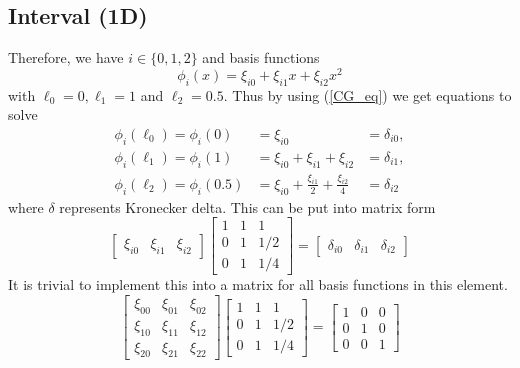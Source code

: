 \documentclass[12pt]{ociamthesis}
\begin{document}
\subsection{Interval (1D)}
Therefore, we have $i \in \{0, 1, 2\}$ and basis functions 
\begin{equation}
\phi_i(x) = \xi_{i0} + \xi_{i1}x + \xi_{i2}x^2
\end{equation}
with $\ell_0 = 0, \ell_1 = 1$ and $\ell_2 = 0.5$. Thus by using (\ref{CG_eq}) we get equations to solve
\begin{align}
\phi_i(\ell_0) = \phi_i(0) &= \xi_{i0} &= \delta_{i0},\\
\phi_i(\ell_1) = \phi_i(1) &= \xi_{i0} + \xi_{i1} + \xi_{i2} &= \delta_{i1},\\
\phi_i(\ell_2) = \phi_i(0.5) &= \xi_{i0} + \frac{\xi_{i1}}{2} + \frac{\xi_{i2}}{4} &= \delta_{i2}
\end{align}
where $\delta$ represents Kronecker delta. This can be put into matrix form
\begin{equation}
\left[ \begin{matrix}
\xi_{i0} & \xi_{i1} & \xi_{i2}
\end{matrix} \right]
\left[ \begin{matrix}
1 & 1 & 1 \\
0 & 1 & 1/2 \\
0 & 1 & 1/4
\end{matrix} \right] = 
\left[ \begin{matrix}
\delta_{i0} & \delta_{i1} & \delta_{i2}
\end{matrix} \right]
\end{equation}
It is trivial to implement this into a matrix for all basis functions in this element.
\begin{equation}
\left[ \begin{matrix}
\xi_{00} & \xi_{01} & \xi_{02} \\
\xi_{10} & \xi_{11} & \xi_{12} \\
\xi_{20} & \xi_{21} & \xi_{22} 
\end{matrix} \right]
\left[ \begin{matrix}
1 & 1 & 1 \\
0 & 1 & 1/2 \\
0 & 1 & 1/4
\end{matrix} \right] = 
\left[ \begin{matrix}
1 & 0 & 0 \\
0 & 1 & 0 \\
0 & 0 & 1
\end{matrix} \right]
\end{equation}
\end{document}

